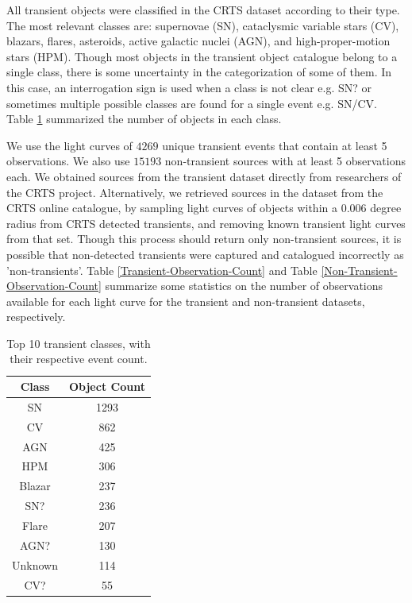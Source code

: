 \documentclass[a4paper,fleqn,usenatbib]{mnras}
\begin{document}
All transient objects were classified in the CRTS dataset according to
their type. 
The most relevant classes are: supernovae (SN),
cataclysmic variable stars (CV), blazars, flares, asteroids, active
galactic nuclei (AGN), and high-proper-motion stars (HPM). 
Though most objects in the transient object catalogue belong to a single class,
there is some uncertainty in the categorization of some of
them. 
In this case, an interrogation sign is used when a class is not clear
e.g. SN? or sometimes multiple possible classes are found for a single
event e.g. SN/CV.
Table \ref{Top-Transient-Classes} summarized the number of objects in each class.


We use the light curves of $4269$ unique transient events that
contain at least 5 observations.
We also use $15193$ non-transient sources with at least 5 observations each. 
We obtained sources from the transient dataset directly from researchers of the CRTS project. Alternatively, we retrieved sources in the dataset from the
CRTS online catalogue, by sampling light curves of objects within a 0.006 
degree radius from CRTS detected transients, and removing known transient 
light curves from that set. 
Though this process should return only non-transient sources, it is
possible that non-detected transients were captured and catalogued
incorrectly as 'non-transients'.  
Table \ref{Transient-Observation-Count} and
Table \ref{Non-Transient-Observation-Count} summarize some statistics
on the number of observations available for each light curve for the
transient and non-transient datasets, respectively.  



\begin{table}
\centering
\begin{tabular}{c|c}
    \hline
    Class &  Object Count \\
    \hline
    SN & 1293 \\
    CV & 862 \\
    AGN & 425 \\
    HPM & 306 \\
    Blazar & 237 \\
    SN? & 236 \\
    Flare & 207 \\
    AGN? & 130 \\
    Unknown & 114 \\
    CV? & 55 \\
    \hline
\end{tabular}
\caption{Top 10 transient classes, with their respective event count.}
\label{Top-Transient-Classes}
\end{table}
\end{document}

